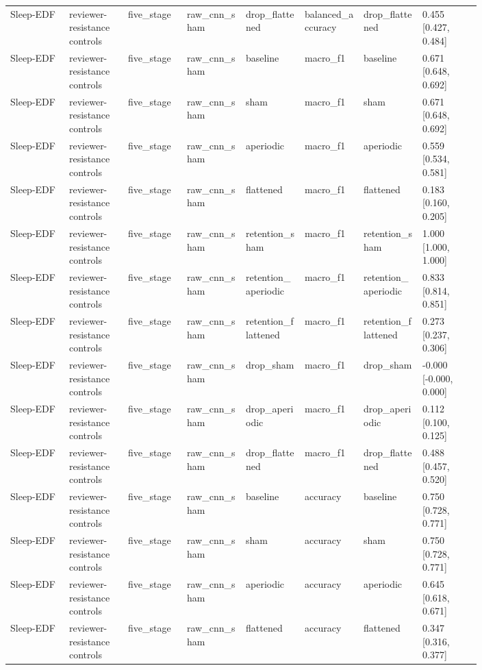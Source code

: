 \begin{longtable}{p{0.10\linewidth}p{0.10\linewidth}p{0.10\linewidth}p{0.10\linewidth}p{0.10\linewidth}p{0.10\linewidth}p{0.10\linewidth}p{0.10\linewidth}}
Sleep-EDF & reviewer-resistance controls & five\_stage & raw\_cnn\_sham & drop\_flattened & balanced\_accuracy & drop\_flattened & 0.455 [0.427, 0.484]\\
Sleep-EDF & reviewer-resistance controls & five\_stage & raw\_cnn\_sham & baseline & macro\_f1 & baseline & 0.671 [0.648, 0.692]\\
Sleep-EDF & reviewer-resistance controls & five\_stage & raw\_cnn\_sham & sham & macro\_f1 & sham & 0.671 [0.648, 0.692]\\
Sleep-EDF & reviewer-resistance controls & five\_stage & raw\_cnn\_sham & aperiodic & macro\_f1 & aperiodic & 0.559 [0.534, 0.581]\\
Sleep-EDF & reviewer-resistance controls & five\_stage & raw\_cnn\_sham & flattened & macro\_f1 & flattened & 0.183 [0.160, 0.205]\\
Sleep-EDF & reviewer-resistance controls & five\_stage & raw\_cnn\_sham & retention\_sham & macro\_f1 & retention\_sham & 1.000 [1.000, 1.000]\\
Sleep-EDF & reviewer-resistance controls & five\_stage & raw\_cnn\_sham & retention\_aperiodic & macro\_f1 & retention\_aperiodic & 0.833 [0.814, 0.851]\\
Sleep-EDF & reviewer-resistance controls & five\_stage & raw\_cnn\_sham & retention\_flattened & macro\_f1 & retention\_flattened & 0.273 [0.237, 0.306]\\
Sleep-EDF & reviewer-resistance controls & five\_stage & raw\_cnn\_sham & drop\_sham & macro\_f1 & drop\_sham & -0.000 [-0.000, 0.000]\\
Sleep-EDF & reviewer-resistance controls & five\_stage & raw\_cnn\_sham & drop\_aperiodic & macro\_f1 & drop\_aperiodic & 0.112 [0.100, 0.125]\\
Sleep-EDF & reviewer-resistance controls & five\_stage & raw\_cnn\_sham & drop\_flattened & macro\_f1 & drop\_flattened & 0.488 [0.457, 0.520]\\
Sleep-EDF & reviewer-resistance controls & five\_stage & raw\_cnn\_sham & baseline & accuracy & baseline & 0.750 [0.728, 0.771]\\
Sleep-EDF & reviewer-resistance controls & five\_stage & raw\_cnn\_sham & sham & accuracy & sham & 0.750 [0.728, 0.771]\\
Sleep-EDF & reviewer-resistance controls & five\_stage & raw\_cnn\_sham & aperiodic & accuracy & aperiodic & 0.645 [0.618, 0.671]\\
Sleep-EDF & reviewer-resistance controls & five\_stage & raw\_cnn\_sham & flattened & accuracy & flattened & 0.347 [0.316, 0.377]\\

\end{longtable}
